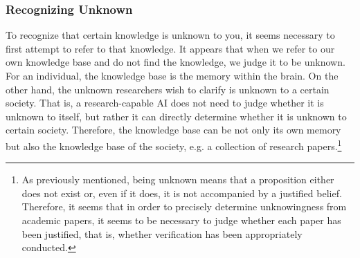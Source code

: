 \subsubsection{Recognizing Unknown}
To recognize that certain knowledge is unknown to you, it seems necessary to first attempt to refer to that knowledge. It appears that when we refer to our own knowledge base and do not find the knowledge, we judge it to be unknown. For an individual, the knowledge base is the memory within the brain. On the other hand, the unknown researchers wish to clarify is unknown to a certain society. That is, a research-capable AI does not need to judge whether it is unknown to itself, but rather it can directly determine whether it is unknown to certain society. Therefore, the knowledge base can be not only its own memory but also the knowledge base of the society, e.g. a collection of research papers.\footnote{
As previously mentioned, being unknown means that a proposition either does not exist or, even if it does, it is not accompanied by a justified belief. Therefore, it seems that in order to precisely determine unknowingness from academic papers, it seems to be necessary to judge whether each paper has been justified, that is, whether verification has been appropriately conducted. 
}



